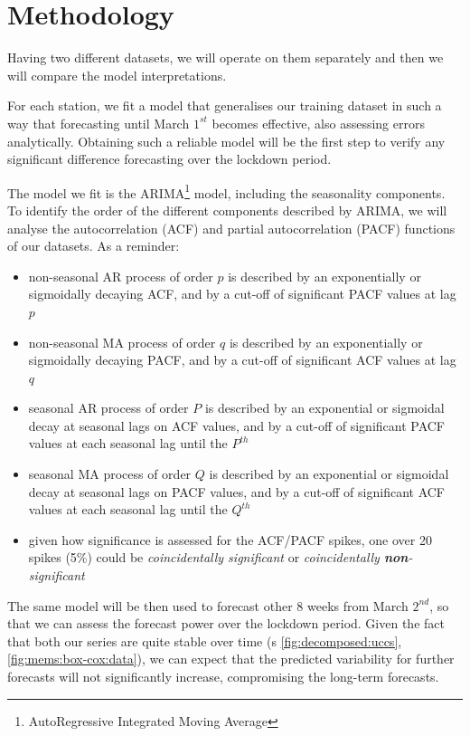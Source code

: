 \documentclass[12pt]{article}
\begin{document}
\section{Methodology}\label{sec:methodology}
Having two different datasets, we will operate on them separately and then we will compare the model interpretations.

For each station, we fit a model that generalises our training dataset in such a way that forecasting until March $1^{st}$ becomes effective, also assessing errors analytically.
Obtaining such a reliable model will be the first step to verify any significant difference forecasting over the lockdown period.

The model we fit is the ARIMA\footnote{AutoRegressive Integrated Moving Average} model, including the seasonality components. To identify the order of the different components described by ARIMA, we will analyse the autocorrelation (ACF) and partial autocorrelation (PACF) functions of our datasets.
As a reminder:
\begin{itemize}[topsep=0.5em,itemsep=0em,partopsep=0.5em]
	\item non-seasonal AR process of order $p$ is described by an exponentially or sigmoidally decaying ACF, and by a cut-off of significant PACF values at lag $p$
	\item non-seasonal MA process of order $q$ is described by an exponentially or sigmoidally decaying PACF, and by a cut-off of significant ACF values at lag $q$
	\item seasonal AR process of order $P$ is described by an exponential or sigmoidal decay at seasonal lags on ACF values, and by a cut-off of significant PACF values at each seasonal lag until the $P^{th}$
	\item seasonal MA process of order $Q$ is described by an exponential or sigmoidal decay at seasonal lags on PACF values, and by a cut-off of significant ACF values at each seasonal lag until the $Q^{th}$
	\item given how significance is assessed for the ACF/PACF spikes, one over 20 spikes (5\%) could be \textit{coincidentally significant} or \textit{coincidentally \textbf{non}-significant}
\end{itemize}

The same model will be then used to forecast other 8 weeks from March $2^{nd}$, so that we can assess the forecast power over the lockdown period. Given the fact that both our series are quite stable over time (\figurename{s} \ref{fig:decomposed:uccs}, \ref{fig:mems:box-cox:data}), we can expect that the predicted variability for further forecasts will not significantly increase, compromising the long-term forecasts.
\end{document}
